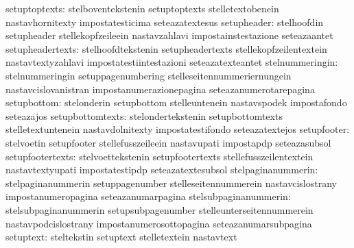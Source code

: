                    setuptoptexts: stelboventekstenin               setuptoptexts
                                  stelletextobenein                nastavhornitexty
                                  impostatesticima                 seteazatextesus
                     setupheader: stelhoofdin                      setupheader
                                  stellekopfzeileein               nastavzahlavi
                                  impostainstestazione             seteazaantet
                setupheadertexts: stelhoofdtekstenin               setupheadertexts
                                  stellekopfzeilentextein          nastavtextyzahlavi
                                  impostatestiintestazioni         seteazatexteantet
                 stelnummeringin: stelnummeringin                  setuppagenumbering
                                  stelleseitennummeriernungein     nastavcislovanistran
                                  impostanumerazionepagina         seteazanumerotarepagina
                     setupbottom: stelonderin                      setupbottom
                                  stelleuntenein                   nastavspodek
                                  impostafondo                     seteazajos
                setupbottomtexts: stelondertekstenin               setupbottomtexts
                                  stelletextuntenein               nastavdolnitexty
                                  impostatestifondo                seteazatextejos
                     setupfooter: stelvoetin                       setupfooter
                                  stellefusszeileein               nastavupati
                                  impostapdp                       seteazasubsol
                setupfootertexts: stelvoettekstenin                setupfootertexts
                                  stellefusszeilentextein          nastavtextyupati
                                  impostatestipdp                  seteazatextesubsol
              stelpaginanummerin: stelpaginanummerin               setuppagenumber
                                  stelleseitennummerein            nastavcislostrany
                                  impostanumeropagina              seteazanumarpagina
           stelsubpaginanummerin: stelsubpaginanummerin            setupsubpagenumber
                                  stelleunterseitennummerein       nastavpodcislostrany
                                  impostanumerosottopagina         seteazanumarsubpagina
                       setuptext: steltekstin                      setuptext
                                  stelletextein                    nastavtext
